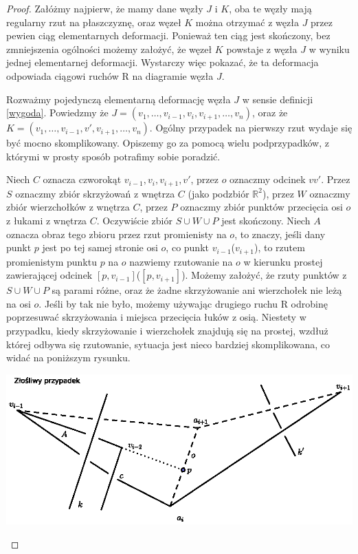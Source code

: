 \begin{proof}

Załóżmy najpierw, że mamy dane węzły $J$ i $K$, oba te węzły mają regularny rzut na płaszczyznę, oraz węzeł $K$ można otrzymać z węzła $J$ przez pewien ciąg elementarnych deformacji.
Ponieważ ten ciąg jest skończony, bez zmniejszenia ogólności możemy założyć, że węzeł $K$ powstaje z węzła $J$ w wyniku jednej elementarnej deformacji. Wystarczy więc pokazać, że 
ta deformacja odpowiada ciągowi ruchów R na diagramie węzła $J$. 

Rozważmy pojedynczą elementarną deformację węzła $J$ w sensie definicji \ref{wygoda}. Powiedzmy że $J = (v_1, \ldots, v_{i-1}, v_i, v_{i+1}, \ldots, v_n)$, oraz że 
$K = (v_1, \ldots, v_{i-1}, v', v_{i+1}, \ldots, v_n)$. Ogólny przypadek na pierwszy rzut wydaje się być mocno skomplikowany. Opiszemy go za pomocą wielu podprzypadków, z którymi
w prosty sposób potrafimy sobie poradzić. 

Niech $C$ oznacza czworokąt $v_{i-1}, v_i, v_{i+1}, v'$, przez $o$ oznaczmy odcinek $vv'$. Przez $S$ oznaczmy zbiór skrzyżowań z wnętrza $C$ (jako podzbiór $\mathbb{R}^2$), 
przez $W$ oznaczmy zbiór wierzchołków z wnętrza $C$, przez $P$ oznaczmy zbiór punktów przecięcia osi $o$ z łukami z wnętrza $C$. 
Oczywiście zbiór $S\cup W\cup P$ jest skończony. Niech $A$ oznacza obraz tego zbioru przez rzut promienisty na $o$, to znaczy, jeśli dany punkt $p$ jest po tej samej stronie osi $o$, 
co punkt $v_{i-1}$($v_{i+1}$), to rzutem promienistym punktu $p$ na $o$ nazwiemy rzutowanie na $o$ w kierunku prostej zawierającej odcinek $[p, v_{i-1}]$($[p, v_{i+1}]$). 
Możemy założyć, że rzuty punktów z $S\cup W\cup P$ są parami różne, oraz że żadne skrzyżowanie ani wierzchołek nie leżą na osi $o$.
Jeśli by tak nie było, możemy używając drugiego ruchu R odrobinę poprzesuwać skrzyżowania i miejsca przecięcia łuków z osią. 
Niestety w przypadku, kiedy skrzyżowanie i wierzchołek znajdują się na prostej, wzdłuż której odbywa się rzutowanie, sytuacja jest nieco bardziej skomplikowana, co widać na poniższym
rysunku.


\begin{minipage}{0.3\textwidth}
	\begin{center}

	\includegraphics[scale=0.8]{1/pictures/bad.eps}
	\end{center}
	\end{minipage}


\end{proof}
